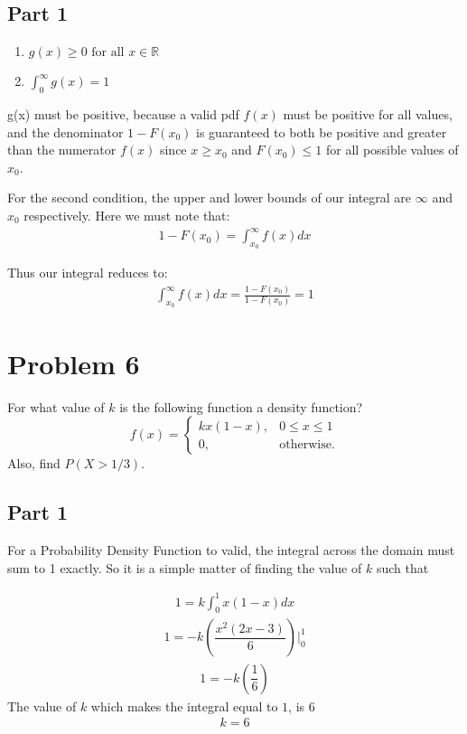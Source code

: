 \documentclass{article}
\begin{document}
\subsection*{Part 1}
\begin{enumerate}
\item
$g(x) \geq 0 \text{ for all }x \in \mathbb{R}$
\item
$\int_{0}^\infty g(x) = 1$
\end{enumerate}

g(x) must be positive, because a valid pdf $f(x)$ must be positive for all values, and the denominator $1-F(x_0)$ is guaranteed to both be positive and greater than the numerator $f(x)$ since $x\geq x_0$ and $F(x_0)\leq 1$ for all possible values of $x_0$.

For the second condition, the upper and lower bounds of our integral are $\infty$ and $x_0$ respectively. Here we must note that:
\begin{align*}
1-F(x_0) = \int_{x_0}^\infty f(x) dx
\end{align*}

Thus our integral reduces to:
\begin{align*}
\boxed{\int_{x_0}^\infty f(x) dx = \frac{1-F(x_0)}{1-F(x_0)} = 1}
\end{align*}

\clearpage

\section*{Problem 6}
For what value of $k$ is the following function a density function?
    \[
    f(x) = \begin{cases} kx(1-x), & 0 \le x \le 1 \\ 0, &  \text{otherwise}.\end{cases} 
    \]
    Also, find $P(X >1/3)$.

\subsection*{Part 1}
For a Probability Density Function to valid, the integral across the domain must sum to 1 exactly. So it is a simple matter of finding the value of $k$ such that

\begin{align*}
1 = k \int_{0}^{1} x(1-x)dx
\end{align*}
\begin{align*}
1 = -k(\dfrac{x^2(2x-3)}{6})|_{0}^{1}
\end{align*}
\begin{align*}
1 = -k(\dfrac{1}{6})
\end{align*}
The value of $k$ which makes the integral equal to $1$, is $6$
\begin{align*}
\boxed{k=6}
\end{align*}
\end{document}
